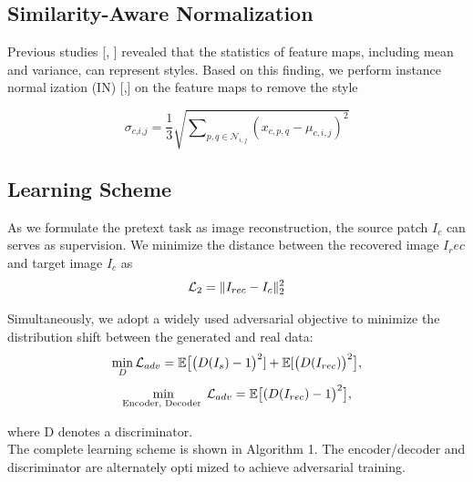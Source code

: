 \documentclass{article}
\begin{document}
\begin{multicols}{2}
\subsection{Similarity-Aware Normalization}
Previous studies [\cite{huang2017arbitrary}, \cite{karras2019style}] revealed that the statistics of
feature maps, including mean and variance, can represent
styles. Based on this finding, we perform instance normalization (IN) [\cite{huang2017arbitrary},\cite{ulyanov2016instance}] on the feature maps to remove the style

\begin{equation}
    \sigma_{\textit{c,i,j}} = 
    \frac{1}{3}\sqrt{\sum\nolimits_{p,q \in \mathcal{N}_{i,j}} (x_{c,p,q}-\mu_{c,i,j})^2}
\end{equation}

\subsection{Learning Scheme}
As we formulate the pretext task as image reconstruction, the source patch $I_c$ can serves as supervision. We minimize the distance between the recovered image $I_rec$ and
target image $I_c$ as
\begin{equation}
    \small \mathcal {L}_2 = \| I_{rec} - I_c \|_{2}^{2}
\end{equation}
 
Simultaneously, we adopt a widely used adversarial objective to minimize the distribution shift between the generated and real data:
\begin{equation}
     \small \min _{D} \mathcal {L}_{adv}=\mathbb {E} \big [ \big (D (I_s)-1 \big )^{2} ]+\mathbb {E} [ \big (D (I_{rec} ) \big )^{2} \big ], 

\end{equation}
\begin{equation}
     \small \min _{\text {Encoder, Decoder }} \mathcal {L}_{adv}=\mathbb {E}\big [ (D (I_{rec})-1\big )^{2}\big ], 
\end{equation}

where D denotes a discriminator.\\
The complete learning scheme is shown in Algorithm 1.
The encoder/decoder and discriminator are alternately optimized to achieve adversarial training.



\end{multicols}
\end{document}
